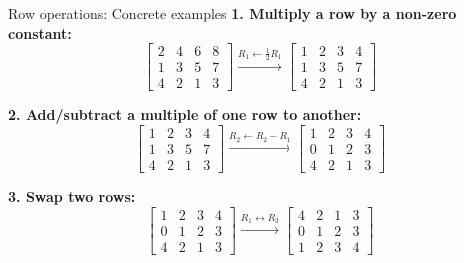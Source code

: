 \documentclass[aspectratio=169, lualatex, handout]{beamer}
\begin{document}
\begin{frame}{Row operations: Concrete examples}
\small
	\textbf{1. Multiply a row by a non-zero constant:}
	\[
		\left[\begin{array}{ccc|c}
				2 & 4 & 6 & 8 \\
				1 & 3 & 5 & 7 \\
				4 & 2 & 1 & 3
			\end{array}\right]
		\xrightarrow{R_1 \leftarrow \frac{1}{2}R_1}
		\left[\begin{array}{ccc|c}
				1 & 2 & 3 & 4 \\
				1 & 3 & 5 & 7 \\
				4 & 2 & 1 & 3
			\end{array}\right]
	\]

	\textbf{2. Add/subtract a multiple of one row to another:}
	\[
		\left[\begin{array}{ccc|c}
				1 & 2 & 3 & 4 \\
				1 & 3 & 5 & 7 \\
				4 & 2 & 1 & 3
			\end{array}\right]
		\xrightarrow{R_2 \leftarrow R_2 - R_1}
		\left[\begin{array}{ccc|c}
				1 & 2 & 3 & 4 \\
				0 & 1 & 2 & 3 \\
				4 & 2 & 1 & 3
			\end{array}\right]
	\]

	\textbf{3. Swap two rows:}
	\[
		\left[\begin{array}{ccc|c}
				1 & 2 & 3 & 4 \\
				0 & 1 & 2 & 3 \\
				4 & 2 & 1 & 3
			\end{array}\right]
		\xrightarrow{R_1 \leftrightarrow R_3}
		\left[\begin{array}{ccc|c}
				4 & 2 & 1 & 3 \\
				0 & 1 & 2 & 3 \\
				1 & 2 & 3 & 4
			\end{array}\right]
	\]
\end{frame}
\end{document}
